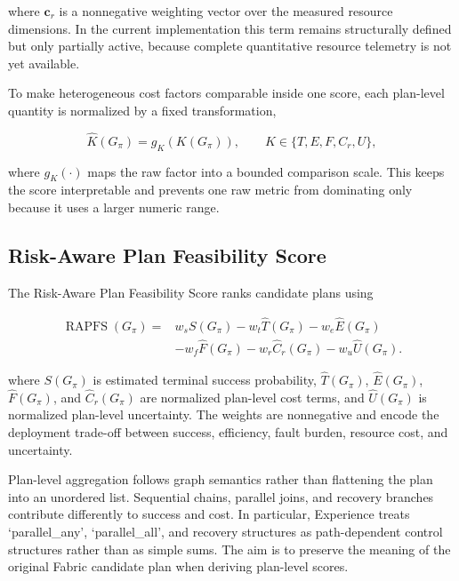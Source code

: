 \documentclass[letterpaper, 10pt, conference]{ieeeconf}
\begin{document}
where $\mathbf{c}_r$ is a nonnegative weighting vector over the measured resource dimensions. In the current implementation this term remains structurally defined but only partially active, because complete quantitative resource telemetry is not yet available.

To make heterogeneous cost factors comparable inside one score, each plan-level quantity is normalized by a fixed transformation,

\begin{equation}
\hat{K}(G_{\pi})=g_K\left(K(G_{\pi})\right),
\qquad
K\in\{T,E,F,C_r,U\},
\end{equation}

where $g_K(\cdot)$ maps the raw factor into a bounded comparison scale. This keeps the score interpretable and prevents one raw metric from dominating only because it uses a larger numeric range.

\subsection{Risk-Aware Plan Feasibility Score}

The Risk-Aware Plan Feasibility Score ranks candidate plans using

\begin{equation}
\begin{aligned}
\operatorname{RAPFS}(G_{\pi}) ={}& w_s S(G_{\pi}) - w_t \hat{T}(G_{\pi}) - w_e \hat{E}(G_{\pi}) \\
& - w_f \hat{F}(G_{\pi}) - w_r \hat{C}_r(G_{\pi}) - w_u \hat{U}(G_{\pi}).
\end{aligned}
\end{equation}

where $S(G_{\pi})$ is estimated terminal success probability, $\hat{T}(G_{\pi})$, $\hat{E}(G_{\pi})$, $\hat{F}(G_{\pi})$, and $\hat{C}_r(G_{\pi})$ are normalized plan-level cost terms, and $\hat{U}(G_{\pi})$ is normalized plan-level uncertainty. The weights are nonnegative and encode the deployment trade-off between success, efficiency, fault burden, resource cost, and uncertainty.

Plan-level aggregation follows graph semantics rather than flattening the plan into an unordered list. Sequential chains, parallel joins, and recovery branches contribute differently to success and cost. In particular, Experience treats `parallel\_any', `parallel\_all', and recovery structures as path-dependent control structures rather than as simple sums. The aim is to preserve the meaning of the original Fabric candidate plan when deriving plan-level scores.
\end{document}

